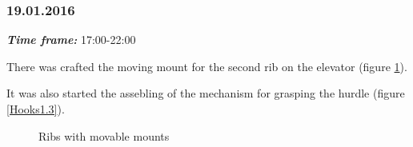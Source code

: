 \subsubsection{19.01.2016}
\textit{\textbf{Time frame:}} 17:00-22:00 

There was crafted the moving mount for the second rib on the elevator (figure \ref{Elevator3.5}).

It was also started the assebling of the mechanism for grasping the hurdle (figure \ref{Hooks1.3}).

\begin{figure}[H]
	\begin{minipage}[h]{0.58\linewidth}
		\caption{Ribs with movable mounts}
		\label{Elevator3.5}
	\end{minipage}
	\hfill
	\begin{minipage}[h]{0.37\linewidth}

\end{minipage}
\end{figure}
